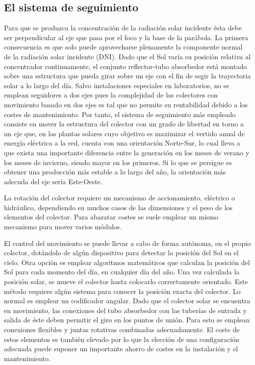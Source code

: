\subsection{El sistema de seguimiento}
\label{sistemadeseguimiento}
Para que se produzca la concentración de la radiación solar incidente ésta debe ser perpendicular al eje que pasa por el foco y la base de la parábola. La primera consecuencia es que solo puede aprovecharse plenamente la componente normal de la radiación solar incidente (DNI). Dado que el Sol varía su posición relativa al concentrador continuamente, el conjunto reflector-tubo absorbedor está montado sobre una estructura que pueda girar sobre un eje con el fin de segir la trayectoria solar a lo largo del día. Salvo instalaciones especiales en laboratorios, no se emplean seguidores a dos ejes pues la complejidad de los colectores con movimiento basado en dos ejes es tal que no permite su rentabilidad debido a los costes de mantenimiento. Por tanto, el sistema de seguimiento más empleado consiste en mover la estructura del colector con un grado de libertad en torno a un eje que, en las plantas solares cuyo objetivo es maximizar el vertido anual de energía eléctrica a la red, cuenta con una orientación Norte-Sur, lo cual lleva a que exista una importante diferencia entre la generación en los meses de verano y los meses de invierno, siendo mayor en los primeros. Si lo que se persigue es obtener una producción más estable a lo largo del año, la orientación más adecuda del eje sería Este-Oeste.

La rotación del colector requiere un mecanismo de accionamiento, eléctrico o hidráulico,
dependiendo en muchos casos de las dimensiones y el peso de los elementos del colector. Para abaratar costes se suele emplear un mismo mecanismo para mover varios módulos.

El control del movimiento se puede llevar a cabo de forma autónoma, en el propio colector, dotándolo de algún dispositivo para detectar la posición del Sol en el cielo. Otra opción es emplear algoritmos matemáticos que calculan la posición del Sol para cada momento del día, en cualquier día del año. Una vez calculada la posición solar, se mueve el colector hasta colocarlo correctamente orientado. Este método requiere algún sistema para conocer la posición exacta del colector. Lo normal es emplear un codificador angular.
Dado que el colector solar se encuentra en movimiento, las conexiones del tubo absorbedor con las tuberías de entrada y salida de éste deben permitir el giro en los puntos de unión. Para esto se emplean conexiones flexibles y juntas rotativas combinadas adecuadamente. El coste de estos elementos es también elevado por lo que la elección de una configuración adecuada puede suponer un importante ahorro de costes en la instalación y el mantenimiento.

